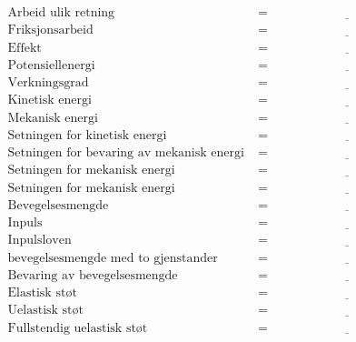 \documentclass{article}
\begin{document}
\begin{align*}
    \text{Arbeid ulik retning} &= \underline{\hspace{5cm}} \\
    \text{Friksjonsarbeid} &= \underline{\hspace{5cm}} \\
    \text{Effekt} &= \underline{\hspace{5cm}} \\
    \text{Potensiellenergi} &= \underline{\hspace{5cm}} \\
    \text{Verkningsgrad} &= \underline{\hspace{5cm}} \\
    \text{Kinetisk energi} &= \underline{\hspace{5cm}} \\
    \text{Mekanisk energi} &= \underline{\hspace{5cm}} \\
    \text{Setningen for kinetisk energi} &= \underline{\hspace{5cm}} \\
    \text{Setningen for bevaring av mekanisk energi} &= \underline{\hspace{5cm}} \\
    \text{Setningen for mekanisk energi} &= \underline{\hspace{5cm}} \\
    \text{Setningen for mekanisk energi} &= \underline{\hspace{5cm}} \\
    \text{Bevegelsesmengde} &= \underline{\hspace{5cm}} \\
    \text{Inpuls} &= \underline{\hspace{5cm}} \\
    \text{Inpulsloven} &= \underline{\hspace{5cm}} \\
    \text{bevegelsesmengde med to gjenstander} &= \underline{\hspace{5cm}} \\
    \text{Bevaring av bevegelsesmengde} &= \underline{\hspace{5cm}} \\
    \text{Elastisk st\o t} &= \underline{\hspace{5cm}} \\
    \text{Uelastisk st\o t} &= \underline{\hspace{5cm}} \\
    \text{Fullstendig uelastisk st\o t} &= \underline{\hspace{5cm}} \\

\end{align*}
\end{document}
